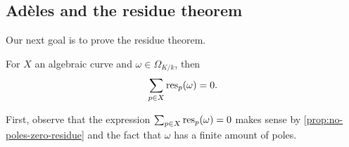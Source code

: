 \subsection*{Adèles and the residue theorem}
Our next goal is to prove the residue theorem.
\begin{theorem}\label{thm:residue-theorem}
	For $X$ an algebraic curve and $\omega \in \Omega_{K/k}$, then 
	\[
		\sum_{p\in X}\operatorname{res}_{p}(\omega) = 0.
	\]
\end{theorem}
First, observe that the expression $\sum_{p\in X}\operatorname{res}_{p}(\omega) = 0$ makes sense by \cref{prop:no-poles-zero-residue} and the fact that $\omega$ has a finite amount of poles.

